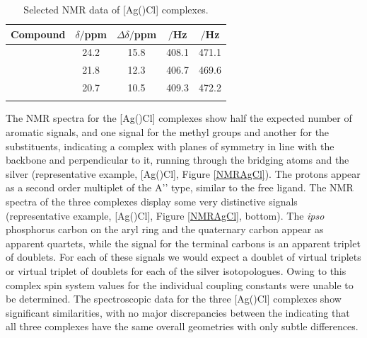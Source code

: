 \begin{table}[htbp]
\caption[Selected NMR data of [Ag(\tBuxantphos)Cl{]} complexes]{Selected NMR data of [Ag(\tBuxantphos)Cl] complexes.} 
\vspace{1em}
\label{table:silverchlorides}
\small
\begin{center}
\begin{tabular}{l c c c c}
	\toprule{}
	\bfseries{Compound}&\bfseries{$\delta$\phosphorus{}$/$ppm}&\bfseries{$\Delta\delta/$ppm}&\bfseries{\JAgPseven{}$/$Hz}&\bfseries{\JAgPnine{}$/$Hz}\\
	\midrule{}
	~\tBuSixantphos	&	24.2	&	15.8	&	408.1	&	471.1\\
	~\tBuThixantphos	& 	21.8	&	12.3	&	406.7	&	469.6\\
	~\tBuXantphos		&	20.7	&	10.5	&	409.3	&	472.2\\
	\bottomrule{}
\end{tabular}
\end{center}
\end{table}

The \proton{} NMR spectra for the [Ag(\tBuxantphos)Cl] complexes show half the expected number of aromatic signals, and one signal for the methyl groups and another for the \tBu{} substituents, indicating a complex with planes of symmetry in line with the backbone and perpendicular to it, running through the bridging atoms and the silver (representative example, [Ag(\tBusixantphos)Cl], Figure \ref{NMRAgCl}).  The \tBu{} protons appear as a second order multiplet of the A'' type, similar to the free ligand.  The \carbon{} NMR spectra of the three complexes display some very distinctive signals (representative example, [Ag(\tBusixantphos)Cl], Figure \ref{NMRAgCl}, bottom).  The \emph{ipso} phosphorus carbon on the aryl ring and the quaternary \tBu{} carbon appear as apparent quartets, while the signal for the terminal \tBu{} carbons is an apparent triplet of doublets.  For each of these signals we would expect a doublet of virtual triplets or virtual triplet of doublets for each of the silver isotopologues.  Owing to this complex spin system values for the individual coupling constants were unable to be determined.  The spectroscopic data for the three [Ag(\tBuxantphos)Cl] complexes show significant similarities, with no major discrepancies between the indicating that all three complexes have the same overall geometries with only subtle differences.  


